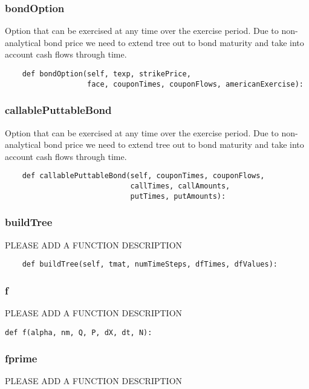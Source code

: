 \documentclass[twoside,11pt]{book}
\begin{document}
\subsubsection*{{\bf bondOption}}
Option that can be exercised at any time over the exercise period. Due to non-analytical bond price we need to extend tree out to bond maturity and take into account cash flows through time.  

\begin{lstlisting}
    def bondOption(self, texp, strikePrice,
                   face, couponTimes, couponFlows, americanExercise):
\end{lstlisting}

\subsubsection*{{\bf callablePuttableBond}}
Option that can be exercised at any time over the exercise period. Due to non-analytical bond price we need to extend tree out to bond maturity and take into account cash flows through time.  

\begin{lstlisting}
    def callablePuttableBond(self, couponTimes, couponFlows,
                             callTimes, callAmounts, 
                             putTimes, putAmounts):
\end{lstlisting}

\subsubsection*{{\bf buildTree}}
PLEASE ADD A FUNCTION DESCRIPTION

\begin{lstlisting}
    def buildTree(self, tmat, numTimeSteps, dfTimes, dfValues):
\end{lstlisting}

\subsubsection*{{\bf f}}
PLEASE ADD A FUNCTION DESCRIPTION

\begin{lstlisting}
def f(alpha, nm, Q, P, dX, dt, N):
\end{lstlisting}

\subsubsection*{{\bf fprime}}
PLEASE ADD A FUNCTION DESCRIPTION
\end{document}
